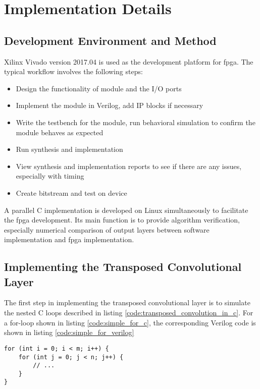 
\chapter{Implementation Details}

\section{Development Environment and Method}

Xilinx Vivado version 2017.04 is used as the development platform for \gls{fpga}. The typical workflow involves
the following steps:

\begin{itemize}
  \item Design the functionality of module and the I/O ports
  \item Implement the module in Verilog, add IP blocks if necessary
  \item Write the testbench for the module, run behavioral simulation to confirm the module behaves as
    expected
  \item Run synthesis and implementation
  \item View synthesis and implementation reports to see if there are any issues, especially with timing
  \item Create bitstream and test on device
\end{itemize}

    A parallel C implementation is developed on Linux simultaneously to facilitate the \gls{fpga} development.
Its main function is to provide algorithm verification, especially numerical comparison of output layers
    between software implementation and \gls{fpga} implementation.

\section{Implementing the Transposed Convolutional Layer}

The first step in implementing the transposed convolutional layer is to simulate the nested C loops
described in listing \ref{code:transposed_convolution_in_c}. For a for-loop shown in listing
\ref{code:simple_for_c}, the corresponding Verilog code is shown in listing \ref{code:simple_for_verilog}

\begin{code}
\begin{verbatim}
for (int i = 0; i < m; i++) {
    for (int j = 0; j < n; j++) {
        // ...
    }
}
\end{verbatim}
\label{code:simple_for_c}
\end{code}

